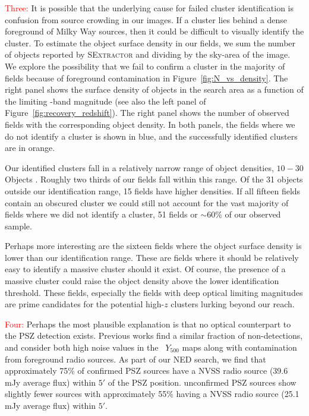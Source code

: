 \documentclass[apj, revtex4-1]{emulateapj}
\newcommand{\editorial}[1]{\textcolor{red}{#1}}
\begin{document}
\editorial{Three:} It is possible that the underlying cause for failed cluster identification is confusion from source crowding in our images. If a cluster lies behind a dense foreground of Milky Way sources, then it could be difficult to visually identify the cluster. To estimate the object surface density in our fields, we sum the number of objects reported by \textsc{SExtractor} and dividing by the sky-area of the image. We explore the possibility that we fail to confirm a cluster in the majority of fields because of foreground contamination in Figure~\ref{fig:N_vs_density}. The right panel shows the surface density of objects in the search area as a function of the limiting \sdssi-band magnitude (see also the left panel of Figure~\ref{fig:recovery_redshift}). The right panel shows the number of observed fields with the corresponding object density. In both panels, the fields where we do not identify a cluster is shown in blue, and the successfully identified clusters are in orange.

Our identified clusters fall in a relatively narrow range of object densities, $10-30$ Objects \perarcminsq. Roughly two thirds of our fields fall within this range. Of the 31 objects outside our identification range, 15 fields have higher densities. If all fifteen fields contain an obscured cluster we could still not account for the vast majority of fields where we did not identify a cluster, 51 fields or $\sim60\%$ of our observed sample.

Perhaps more interesting are the sixteen fields where the object surface density is lower than our identification range. These are fields where it should be relatively easy to identify a massive cluster should it exist. Of course, the presence of a massive cluster could raise the object density above the lower identification threshold. These fields, especially the fields with deep optical limiting magnitudes are prime candidates for the potential high-$z$ clusters lurking beyond our reach.

\editorial{Four:} Perhaps the most plausible explanation is that no optical counterpart to the PSZ detection exists. Previous works  find a similar fraction of non-detections, and consider both high noise values in the \planck\ $Y_{500}$ maps \citep{PlanckCollaboration2014a} along with contamination from foreground radio sources. As part of our NED search, we find that approximately 75\% of confirmed PSZ sources have a NVSS radio source (39.6 mJy average flux) within $5'$ of the PSZ position. unconfirmed PSZ sources show slightly fewer sources with approximately 55\% having a NVSS radio source (25.1 mJy average flux) within $5'$.
\end{document}
